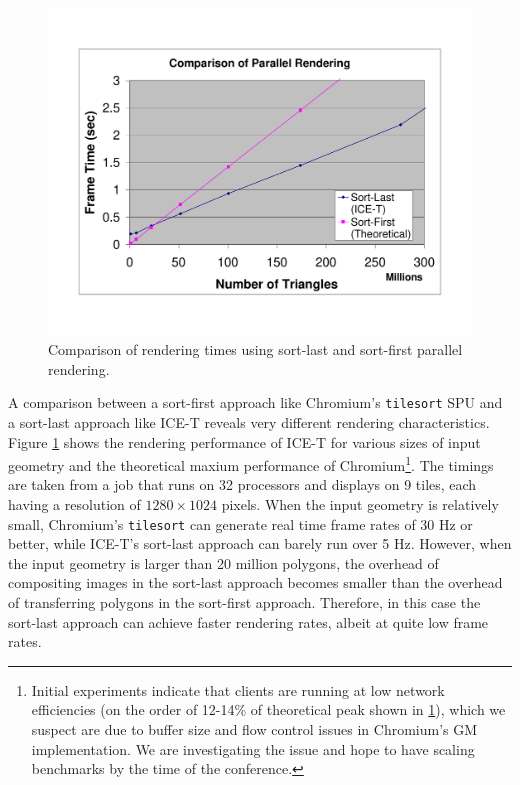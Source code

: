 \documentclass[twocolumn]{article}
\newcommand{\cidentifier}[1]{\texttt{#1}}
\begin{document}
  \begin{figure}
    \includegraphics[width=\linewidth,bb=60 76 725 537]
		    {images/scaling}
    \caption{Comparison of rendering times using sort-last and sort-first
      parallel rendering.}
    \label{fig:scaling}
  \end{figure}

  A comparison between a sort-first approach like Chromium's
  \cidentifier{tile\-sort} SPU and a sort-last approach like ICE-T reveals
  very different rendering characteristics.  Figure \ref{fig:scaling} shows
  the rendering performance of ICE-T for various sizes of input geometry
  and the theoretical maxium performance of Chromium\footnote{Initial
  experiments indicate that clients are running at low network efficiencies
  (on the order of 12-14\% of theoretical peak shown in \ref{fig:scaling}),
  which we suspect are due to buffer size and flow control issues in
  Chromium's GM implementation. We are investigating the issue and hope to
  have scaling benchmarks by the time of the conference.}.  The timings are
  taken from a job that runs on 32 processors and displays on 9 tiles, each
  having a resolution of $1280 \times 1024$ pixels.  When the input
  geometry is relatively small, Chromium's \cidentifier{tile\-sort} can
  generate real time frame rates of 30 Hz or better, while ICE-T's
  sort-last approach can barely run over 5 Hz.  However, when the input
  geometry is larger than 20 million polygons, the overhead of compositing
  images in the sort-last approach becomes smaller than the overhead of
  transferring polygons in the sort-first approach.  Therefore, in this
  case the sort-last approach can achieve faster rendering rates, albeit at
  quite low frame rates.
\end{document}
